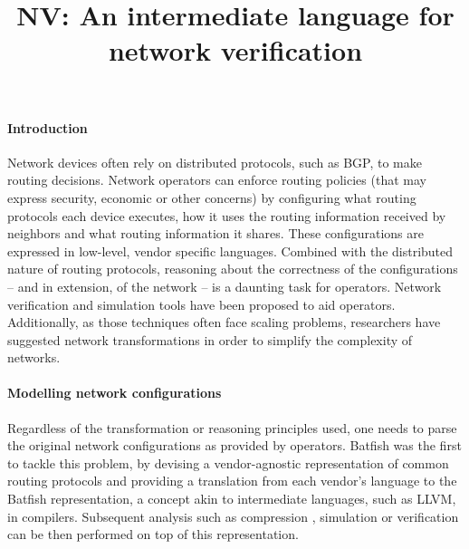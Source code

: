 \documentclass[sigconf,10pt]{acmart}
\begin{document}
\title{NV: An intermediate language for network verification}


\maketitle

%
%
%
%

\paragraph{Introduction}

Network devices often rely on distributed protocols, such as BGP, to
make routing decisions. Network operators can enforce routing policies
(that may express security, economic or other concerns) by configuring
what routing protocols each device executes, how it uses the routing
information received by neighbors and what routing information it
shares. These configurations are expressed in low-level, vendor
specific languages. Combined with the distributed nature of routing
protocols, reasoning about the correctness of the configurations --
and in extension, of the network -- is a daunting task for operators.
Network verification \cite{minesweeper,arc} and simulation tools
\cite{batfish} have been proposed to aid operators. Additionally, as
those techniques often face scaling problems, researchers have
suggested network transformations \cite{bonsai, origami} in order to
simplify the complexity of networks.

\paragraph{Modelling network configurations}
Regardless of the transformation or reasoning principles used, one
needs to parse the original network configurations as provided by
operators. Batfish \cite{batfish} was the first to tackle this
problem, by devising a vendor-agnostic representation of common
routing protocols and providing a translation from each vendor's
language to the Batfish representation, a concept akin to intermediate
languages, such as LLVM, in compilers. Subsequent analysis such as
compression \cite{bonsai}, simulation \cite{batfish} or verification
\cite{minesweeper,arc} can be then performed on top of this
representation.
\end{document}

